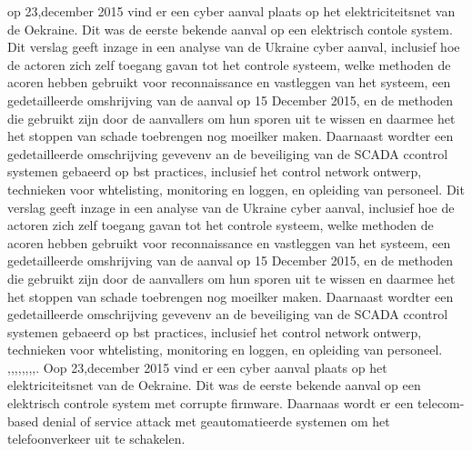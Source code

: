 op 23,december 2015  vind er een cyber aanval plaats op het elektriciteitsnet van de Oekraine. Dit was de eerste bekende aanval op een elektrisch contole  system.  Dit verslag geeft inzage in een analyse van de Ukraine cyber aanval,
inclusief hoe de actoren zich zelf toegang gavan tot het controle systeem, welke methoden de acoren hebben gebruikt voor reconnaissance en vastleggen van het systeem, een gedetailleerde omshrijving van de aanval op 15 December 2015, en de methoden die gebruikt zijn door de aanvallers om hun sporen uit te wissen en daarmee het het stoppen van schade toebrengen  nog moeilker maken. Daarnaast wordter  een gedetailleerde omschrijving gevevenv an de beveiliging van de SCADA ccontrol systemen gebaeerd op bst practices, inclusief het control network ontwerp, technieken voor whtelisting, monitoring en loggen, en  opleiding van personeel.
\cite{Whitehead2017ukrainepoweroutage}
\cite{noauthor_2022-nm}
\cite{zetter2016GridHack}
\cite{owens21032017ukrainemitigationstrategies}
\cite{cerulus2019FrontlineRussiaAttack}
\cite{grammatikis2019AttackIEC6087505104}
\cite{hidajat2016ScadaSimulator}
\cite{uscert20072021crashmalware}
\cite{zetter12062017malwareanalysis}
\cite{icsRussianHackingCyberWeapon}
\cite{usgovC2M2}
Dit verslag geeft inzage in een analyse van de Ukraine cyber aanval,
inclusief hoe de actoren zich zelf toegang gavan tot het controle systeem, welke methoden de acoren hebben gebruikt voor reconnaissance en vastleggen van het systeem, een gedetailleerde omshrijving van de aanval op 15 December 2015, en de methoden die gebruikt zijn door de aanvallers om hun sporen uit te wissen en daarmee het het stoppen van schade toebrengen  nog moeilker maken. Daarnaast wordter  een gedetailleerde omschrijving gevevenv an de beveiliging van de SCADA ccontrol systemen gebaeerd op bst practices, inclusief het control network ontwerp, technieken voor whtelisting, monitoring en loggen, en  opleiding van personeel.
\cite{Whitehead2017ukrainepoweroutage},\cite{zetter2016GridHack},\cite{boozallen2016lightwentout},\cite{finklejan2016UsBlamesRussianSandworm},\cite{desarnaud2017cyberattacks},\cite{caseli04112016intrusiondetectioncontrolsystem},\cite{rochascadatesting},\cite{hidajat2016ScadaSimulator},\cite{zetter2017moreDangerousMalware}.
Oop 23,december 2015  vind er een cyber aanval plaats op het elektriciteitsnet van de Oekraine. Dit was de eerste bekende aanval op een elektrisch controle  system met corrupte firmware. Daarnaas wordt er een telecom-based denial of service attack met  geautomatieerde systemen om het telefoonverkeer uit te schakelen.
\cite{Whitehead2017ukrainepoweroutage}
